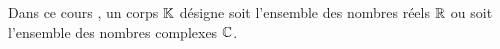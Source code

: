 \documentclass{book}
\begin{document}
\begin{Definition}[Corps \(\K\) : \(\R\) ou \(C\)] Dans ce cours%
, un corps $\K$ désigne soit l'ensemble des nombres réels $\R$ ou soit l'ensemble des nombres complexes $\mathbb{C}$. 
\end{Definition}
\end{document}
